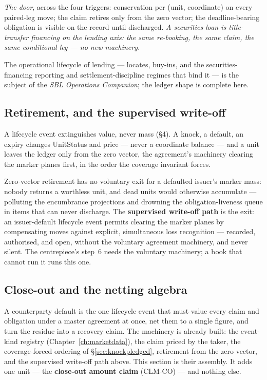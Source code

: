 \documentclass[11pt,a4paper]{article}
\begin{document}
\emph{The door}, across the four triggers: conservation per (unit, coordinate)
on every paired-leg move; the claim retires only from the zero vector; the
deadline-bearing obligation is visible on the record until discharged.
\emph{A securities loan is title-transfer financing on the lending axis: the
same re-booking, the same claim, the same conditional leg --- no new
machinery.}

\medskip
The operational lifecycle of lending --- locates, buy-ins, and the
securities-financing reporting and settlement-discipline regimes that bind it
--- is the subject of the \emph{SBL Operations Companion}; the ledger shape is
complete here.

\subsection{Retirement, and the supervised write-off}

A lifecycle event extinguishes value, never mass (\S4). A knock, a default, an
expiry changes UnitStatus and price --- never a coordinate balance --- and a
unit leaves the ledger only from the zero vector, the agreement's machinery
clearing the marker planes first, in the order the coverage invariant forces.

Zero-vector retirement has no voluntary exit for a defaulted issuer's marker
mass: nobody returns a worthless unit, and dead units would otherwise
accumulate --- polluting the encumbrance projections and drowning the
obligation-liveness queue in items that can never discharge. The
\textbf{supervised write-off path} is the exit: an issuer-default lifecycle
event permits clearing the marker planes by compensating moves against
explicit, simultaneous loss recognition --- recorded, authorised, and open,
without the voluntary agreement machinery, and never silent. The centrepiece's
step~6 needs the voluntary machinery; a book that cannot run it runs this one.

\subsection{Close-out and the netting algebra}\label{sec:closeout}

A counterparty default is the one lifecycle event that must value every claim and
obligation under a master agreement at once, net them to a single figure, and turn the
residue into a recovery claim. The machinery is already built: the event-kind registry
(Chapter~\ref{ch:marketdata}), the claim priced by the taker, the coverage-forced
ordering of \S\ref{sec:knockpledged}, retirement from the zero vector, and the supervised
write-off path above. This section is their assembly. It adds one unit --- the
\textbf{close-out amount claim} (CLM-CO) --- and nothing else.
\end{document}

